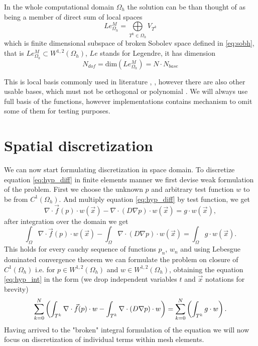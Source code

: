 In the whole computational domain $\Omega_h$ the solution can be than thought 
of as being a member of direct sum of local spaces
\begin{equation}
	Le_{\Omega_h}^{M} = \bigoplus\limits_{T^k \in \Omega_h} V_{T^k}
\end{equation}
which is finite dimensional subspace of broken Sobolev space defined in 
\eqref{eq:sobh}, 
that is $Le_{\Omega_h}^{M} \subset  W^{1,2}(\Omega_h)$, $Le$ stands for Legendre, it has 
dimension
\begin{equation}\label{eq:dim_legh}
	N_{dof} = \text{dim}(Le_{\Omega_h}^{M}) = N\cdot N_{base}
\end{equation}

This is local basis commonly used in literature \cite{Hesthaven2008}, 
\cite{Bokhove2008}, however there are also other usable bases, which must not 
be orthogonal or polynomial \cite{Yuan2006}. We will always use full 
basis of the functions, however implementations contains mechanism to omit some 
of them for testing purposes.

\newpage
\section{Spatial discretization}
We can now start formulating discretization in space domain. To discretize 
equation \eqref{eq:hyp_diff} in finite elements manner we first devise weak 
formulation of the problem. First we choose the unknown $p$ and arbitrary test 
function $w$ to be from $C^1(\Omega_h)$. And multiply equation 
\eqref{eq:hyp_diff} by test function, we get
\begin{equation}
	\nabla\cdot \vec{f}(p)\cdot w(\vec{x}) 
	-  \nabla \cdot (D \nabla p)\cdot w( 
	\vec{x}) = g\cdot w(\vec{x}),
\end{equation}
after integration over the domain we get
\begin{equation}\label{eq:hyp_int}
	 \int_{\Omega}\nabla\cdot \vec{f}(p)\cdot w(\vec{x}) 
	 - \int_{\Omega}\nabla \cdot (D \nabla p)\cdot w(\vec{x}) 
	 = \int_{\Omega}g\cdot w(\vec{x}).
\end{equation}
This holds for every cauchy sequence of functions ${p_n}$, ${w_n}$ and using 
Lebesgue dominated convergence theorem we can formulate the problem on closure 
of $C^1(\Omega_h)$ i.e. for $p \in W^{1,2}(\Omega_h)$ and  $w \in 
W^{1,2}(\Omega_h)$, obtaining the equation \eqref{eq:hyp_int} in the form (we 
drop 
independent variables $t$ and $\vec{x}$ notations for brevity) 
\begin{equation}
	\label{eq:sum_int_hyp}
	\sum\limits_{k=0}^{N}\left(
	\int_{T^k}\nabla\cdot \vec{f}(p)\cdot w
	- \int_{T^k}\nabla \cdot (D \nabla p)\cdot w 
		\right)
 	=\sum\limits_{k=0}^{N}\left(\int_{T^k} g\cdot w\right).
\end{equation}
Having arrived to the "broken" integral formulation of the equation we will now 
focus on discretization of individual terms within mesh elements.

